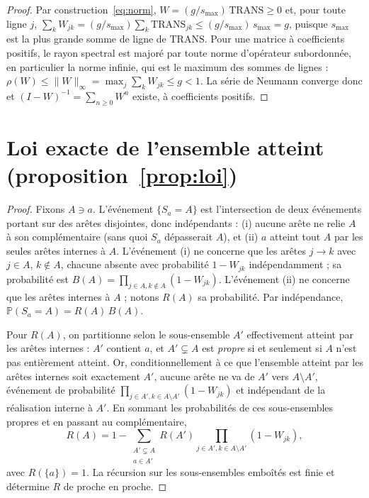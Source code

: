 \begin{proof}
Par construction~\eqref{eq:norm}, $W=(g/s_{\max})\,\mathrm{TRANS}\ge 0$ et, pour toute ligne
$j$, $\sum_k W_{jk}=(g/s_{\max})\sum_k \mathrm{TRANS}_{jk}\le (g/s_{\max})\,s_{\max}=g$, puisque
$s_{\max}$ est la plus grande somme de ligne de $\mathrm{TRANS}$. Pour une matrice à
coefficients positifs, le rayon spectral est majoré par toute norme d'opérateur subordonnée,
en particulier la norme infinie, qui est le maximum des sommes de lignes :
$\rho(W)\le\lVert W\rVert_\infty=\max_j\sum_k W_{jk}\le g<1$. La série de Neumann converge donc
et $(I-W)^{-1}=\sum_{n\ge0}W^n$ existe, à coefficients positifs.
\end{proof}

\section*{Loi exacte de l'ensemble atteint (proposition~\ref{prop:loi})}

\begin{proof}
Fixons $A\ni a$. L'événement $\{S_a=A\}$ est l'intersection de deux événements portant sur des
arêtes disjointes, donc indépendants : (i) aucune arête ne relie $A$ à son complémentaire (sans
quoi $S_a$ dépasserait $A$), et (ii) $a$ atteint tout $A$ par les seules arêtes internes à $A$.
L'événement (i) ne concerne que les arêtes $j\to k$ avec $j\in A$, $k\notin A$, chacune absente
avec probabilité $1-W_{jk}$ indépendamment ; sa probabilité est $B(A)=\prod_{j\in A,k\notin A}(1-W_{jk})$.
L'événement (ii) ne concerne que les arêtes internes à $A$ ; notons $R(A)$ sa probabilité.
Par indépendance, $\mathbb P(S_a=A)=R(A)\,B(A)$.

Pour $R(A)$, on partitionne selon le sous-ensemble $A'$ effectivement atteint par les arêtes
internes : $A'$ contient $a$, et $A'\subsetneq A$ est \emph{propre} si et seulement si $A$
n'est pas entièrement atteint. Or, conditionnellement à ce que l'ensemble atteint par les
arêtes internes soit exactement $A'$, aucune arête ne va de $A'$ vers $A\setminus A'$, événement
de probabilité $\prod_{j\in A',k\in A\setminus A'}(1-W_{jk})$ et indépendant de la réalisation
interne à $A'$. En sommant les probabilités de ces sous-ensembles propres et en passant au
complémentaire,
\[
  R(A)=1-\sum_{\substack{A'\subsetneq A\\ a\in A'}} R(A')\!\!\prod_{j\in A',k\in A\setminus A'}\!\!(1-W_{jk}),
\]
avec $R(\{a\})=1$. La récursion sur les sous-ensembles emboîtés est finie et détermine $R$ de
proche en proche.
\end{proof}

